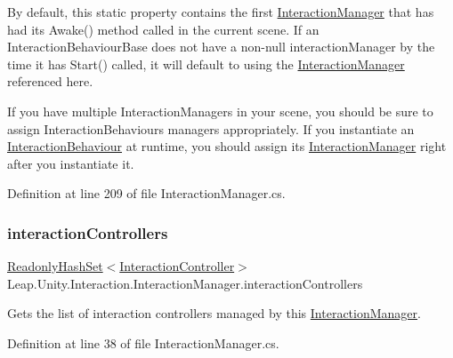 By default, this static property contains the first \mbox{\hyperlink{class_leap_1_1_unity_1_1_interaction_1_1_interaction_manager}{Interaction\+Manager}} that has had its Awake() method called in the current scene. If an Interaction\+Behaviour\+Base does not have a non-\/null interaction\+Manager by the time it has Start() called, it will default to using the \mbox{\hyperlink{class_leap_1_1_unity_1_1_interaction_1_1_interaction_manager}{Interaction\+Manager}} referenced here.

If you have multiple Interaction\+Managers in your scene, you should be sure to assign Interaction\+Behaviours\textquotesingle{} managers appropriately. If you instantiate an \mbox{\hyperlink{class_leap_1_1_unity_1_1_interaction_1_1_interaction_behaviour}{Interaction\+Behaviour}} at runtime, you should assign its \mbox{\hyperlink{class_leap_1_1_unity_1_1_interaction_1_1_interaction_manager}{Interaction\+Manager}} right after you instantiate it. 

Definition at line 209 of file Interaction\+Manager.\+cs.

\mbox{\label{class_leap_1_1_unity_1_1_interaction_1_1_interaction_manager_a8946daadeba0069746b6db6aff5c1ea8}} 
\subsubsection{\texorpdfstring{interactionControllers}{interactionControllers}}
{\footnotesize\ttfamily \mbox{\hyperlink{struct_leap_1_1_unity_1_1_readonly_hash_set}{Readonly\+Hash\+Set}}$<$\mbox{\hyperlink{class_leap_1_1_unity_1_1_interaction_1_1_interaction_controller}{Interaction\+Controller}}$>$ Leap.\+Unity.\+Interaction.\+Interaction\+Manager.\+interaction\+Controllers\hspace{0.3cm}{\ttfamily [get]}}



Gets the list of interaction controllers managed by this \mbox{\hyperlink{class_leap_1_1_unity_1_1_interaction_1_1_interaction_manager}{Interaction\+Manager}}. 



Definition at line 38 of file Interaction\+Manager.\+cs.

